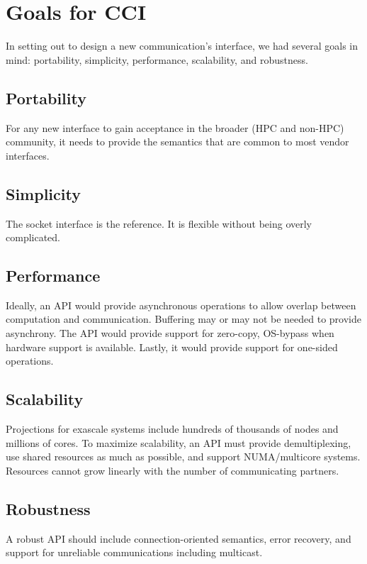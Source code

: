 \documentclass[conference]{IEEEtran}
\begin{document}
\section{Goals for CCI}
In setting out to design a new communication's interface, we had several goals in mind:
portability, simplicity, performance, scalability, and robustness.

\subsection{Portability}
For any new interface to gain acceptance in the broader (HPC and non-HPC) community, it
needs to provide the semantics that are common to most vendor interfaces.

\subsection{Simplicity}
The socket interface is the reference. It is flexible without being overly
complicated.

\subsection{Performance}
Ideally, an API would provide asynchronous operations to allow overlap between computation
and communication. Buffering may or may not be needed to provide asynchrony. The API would
provide support for zero-copy, OS-bypass when hardware support is available. Lastly, it
would provide support for one-sided operations.

\subsection{Scalability}
Projections for exascale systems include hundreds of thousands of nodes and millions of
cores\cite{dongarra:exascale-talk-2010}. To maximize scalability, an API must provide
demultiplexing, use shared resources as much
as possible, and support NUMA/multicore systems. Resources cannot grow linearly with the
number of communicating partners.

\subsection{Robustness}
A robust API should include connection-oriented semantics, error recovery, and support for
unreliable communications including multicast.
\end{document}
